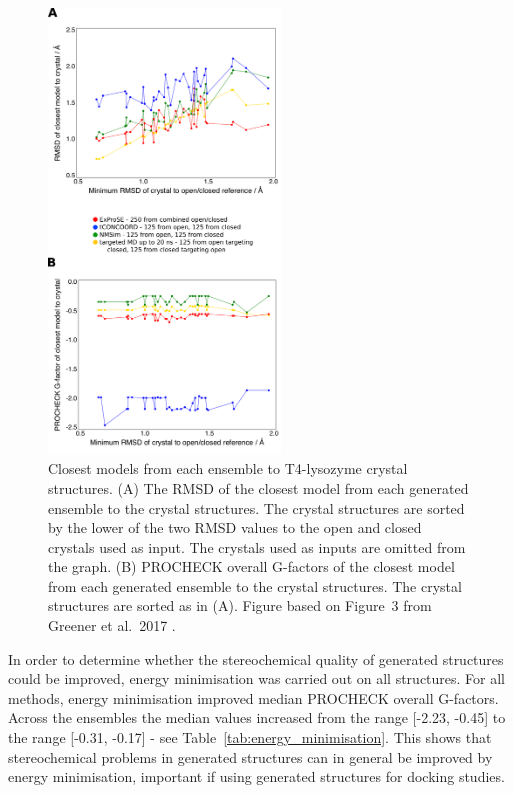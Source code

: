 \begin{figure}
\centering

\includegraphics[width=0.55\textwidth]{figures/t4l_rmsd/t4l_rmsd}

\caption[Closest models from each ensemble to T4-lysozyme crystal structures]
{Closest models from each ensemble to T4-lysozyme crystal structures.
(A) The RMSD of the closest model from each generated ensemble to the crystal structures.
The crystal structures are sorted by the lower of the two RMSD values to the open and closed crystals used as input.
The crystals used as inputs are omitted from the graph.
(B) PROCHECK overall G-factors of the closest model from each generated ensemble to the crystal structures.
The crystal structures are sorted as in (A).
Figure based on Figure~3 from Greener et al.\ 2017 \cite{Greener2017}.}

\label{fig:t4l_rmsd}
\end{figure}


In order to determine whether the stereochemical quality of generated structures could be improved, energy minimisation was carried out on all structures.
For all methods, energy minimisation improved median PROCHECK overall G-factors.
Across the ensembles the median values increased from the range [-2.23, -0.45] to the range [-0.31, -0.17] - see Table~\ref{tab:energy_minimisation}.
This shows that stereochemical problems in generated structures can in general be improved by energy minimisation, important if using generated structures for docking studies.

